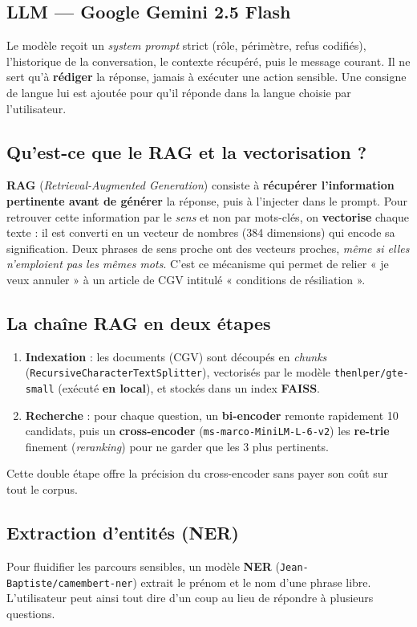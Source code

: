 \documentclass[11pt,a4paper]{article}
\newcommand{\code}[1]{\texttt{\small #1}}
\begin{document}
\subsection{LLM --- Google Gemini 2.5 Flash}
Le modèle reçoit un \emph{system prompt} strict (rôle, périmètre, refus codifiés),
l'historique de la conversation, le contexte récupéré, puis le message courant. Il ne
sert qu'à \textbf{rédiger} la réponse, jamais à exécuter une action sensible. Une
consigne de langue lui est ajoutée pour qu'il réponde dans la langue choisie par
l'utilisateur.

\subsection{Qu'est-ce que le RAG et la vectorisation ?}
\textbf{RAG} (\emph{Retrieval-Augmented Generation}) consiste à \textbf{récupérer
l'information pertinente avant de générer} la réponse, puis à l'injecter dans le
prompt. Pour retrouver cette information par le \emph{sens} et non par mots-clés, on
\textbf{vectorise} chaque texte : il est converti en un vecteur de nombres
(384 dimensions) qui encode sa signification. Deux phrases de sens proche ont des
vecteurs proches, \emph{même si elles n'emploient pas les mêmes mots}. C'est ce
mécanisme qui permet de relier « je veux annuler » à un article de CGV intitulé
« conditions de résiliation ».

\subsection{La chaîne RAG en deux étapes}
\begin{enumerate}[nosep]
  \item \textbf{Indexation} : les documents (CGV) sont découpés en \emph{chunks}
        (\code{RecursiveCharacterTextSplitter}), vectorisés par le modèle
        \code{thenlper/gte-small} (exécuté \textbf{en local}), et stockés dans un index
        \textbf{FAISS}.
  \item \textbf{Recherche} : pour chaque question, un \textbf{bi-encoder} remonte
        rapidement 10 candidats, puis un \textbf{cross-encoder}
        (\code{ms-marco-MiniLM-L-6-v2}) les \textbf{re-trie} finement (\emph{reranking})
        pour ne garder que les 3 plus pertinents.
\end{enumerate}
Cette double étape offre la précision du cross-encoder sans payer son coût sur tout le
corpus.

\subsection{Extraction d'entités (NER)}
Pour fluidifier les parcours sensibles, un modèle \textbf{NER}
(\code{Jean-Baptiste/camembert-ner}) extrait le prénom et le nom d'une phrase libre.
L'utilisateur peut ainsi tout dire d'un coup au lieu de répondre à plusieurs questions.
\end{document}
